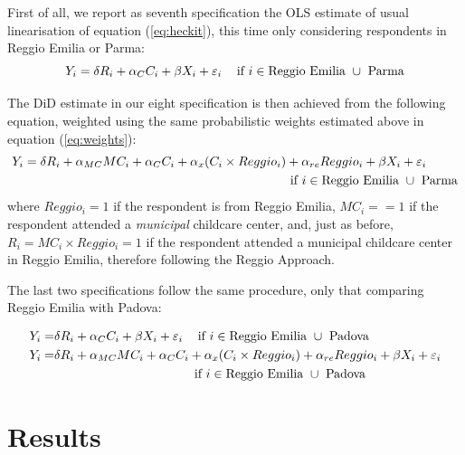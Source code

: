 \documentclass[12pt]{article}
\begin{document}
First of all, we report as seventh specification the OLS estimate of usual
linearisation of equation (\ref{eq:heckit}), this time only considering
respondents in Reggio Emilia or Parma: 
\begin{equation}
Y_{i} = \delta R_{i} + \alpha_{C} C_{i} + \beta X_{i} + \varepsilon_{i} 
\hspace{2ex} \text{ if } i \in \text{Reggio Emilia } \cup \text{ Parma}
\label{eq7:OLSrepr}
\end{equation}

\medskip

The DiD estimate in our eight specification is then achieved from the
following equation, weighted using the same probabilistic weights estimated
above in equation (\ref{eq:weights}): 
\begin{align}
Y_{i} = \delta R_{i} + \alpha_{MC} MC_{i} + \alpha_{C} C_{i} + \alpha_{x}
(C_{i} \times Reggio_{i}) &+ \alpha_{re} Reggio_{i} + \beta X_{i} +
\varepsilon_{i}  \notag \\
& \text{ if } i \in \text{Reggio Emilia } \cup \text{ Parma}
\label{eq8:didpr}
\end{align}
where $Reggio_{i}=1$ if the respondent is from Reggio Emilia, $MC_{i}==1$ if
the respondent attended a \textit{municipal} childcare center, and, just as
before, $R_{i}=MC_{i} \times Reggio_{i}=1$ if the respondent attended a
municipal childcare center in Reggio Emilia, therefore following the Reggio
Approach.

\medskip

The last two specifications follow the same procedure, only that comparing
Reggio Emilia with Padova:

\begin{align}
Y_{i} =& \delta R_{i} + \alpha_{C} C_{i} + \beta X_{i} + \varepsilon_{i} 
\hspace{2ex} \text{ if } i \in \text{Reggio Emilia } \cup \text{ Padova}
\label{eq9:OLSrepd} \\
Y_{i} =& \delta R_{i} + \alpha_{MC} MC_{i} + \alpha_{C} C_{i} + \alpha_{x}
(C_{i} \times Reggio_{i}) + \alpha_{re} Reggio_{i} + \beta X_{i} +
\varepsilon_{i}  \notag \\
& \hspace{25ex} \text{ if } i \in \text{Reggio Emilia } \cup \text{ Padova}
\label{eq10:didpd}
\end{align}


\section{Results}
\end{document}
